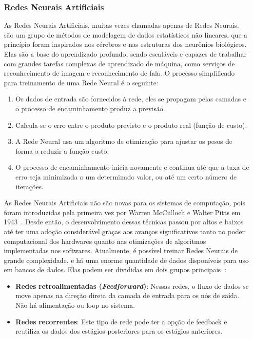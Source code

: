 \documentclass[portugues]{ic-tese}
\begin{document}
\subsubsection{Redes Neurais Artificiais}

As Redes Neurais Artificiais, muitas vezes chamadas apenas de Redes Neurais, são um grupo de métodos de modelagem de dados estatísticos não lineares, que a princípio foram inspirados nos cérebros e nas estruturas dos neurônios biológicos. Elas são a base do aprendizado profundo, sendo escaláveis e capazes de trabalhar com grandes tarefas complexas de aprendizado de máquina, como serviços de reconhecimento de imagem e reconhecimento de fala. O processo simplificado para treinamento de uma Rede Neural é o seguinte:

\begin{enumerate}[label=\textbf{\arabic*.}]
\item Os dados de entrada são fornecidos à rede, eles se propagam pelas camadas e o processo de encaminhamento produz a previsão.
\item Calcula-se o erro entre o produto previsto e o produto real (função de custo).
\item A Rede Neural usa um algoritmo de otimização para ajustar os pesos de forma a reduzir a função custo.
\item O processo de encaminhamento inicia novamente e continua até que a taxa de erro seja minimizada a um determinado valor, ou até um certo número de iterações.
\end{enumerate}

As Redes Neurais Artificiais não são novas para os sistemas de computação, pois foram introduzidas pela primeira vez por Warren McCulloch e Walter Pitts em 1943~\citep{McCulloch_1943}. Desde então, o desenvolvimento dessas técnicas passou por altos e baixos até ter uma adoção considerável graças aos avanços significativos tanto no poder computacional dos hardwares quanto nas otimizações de algoritmos implementadas nos softwares. Atualmente, é possível treinar Redes Neurais de grande complexidade, e há uma enorme quantidade de dados disponíveis para uso em bancos de dados. Elas podem ser divididas em dois grupos principais~\citep{Singh_2009}:

\begin{itemize}
\item \textbf{Redes retroalimentadas (\textit{Feedforward})}: Nessas redes, o fluxo de dados se move apenas na direção direta da camada de entrada para os nós de saída. Não há alimentação ou loop no sistema.
\item \textbf{Redes recorrentes}: Este tipo de rede pode ter a opção de feedback e reutiliza os dados dos estágios posteriores para os estágios anteriores.
\end{itemize}
\end{document}

